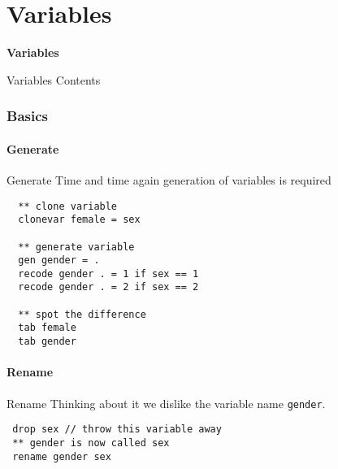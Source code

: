 \part{Variables}
\begin{frame}
\thispagestyle{empty}
\textbf{\huge{Variables}}
\end{frame}

\begin{frame}{Variables Contents}
 \tableofcontents
\end{frame}

\section{Basics}
\subsection{Generate}
\begin{frame}[fragile]{Generate}      
Time and time again generation of variables is required
\begin{lstlisting}
  ** clone variable
  clonevar female = sex

  ** generate variable
  gen gender = .
  recode gender . = 1 if sex == 1
  recode gender . = 2 if sex == 2

  ** spot the difference
  tab female
  tab gender
\end{lstlisting}
\end{frame}

\subsection{Rename}
\begin{frame}[fragile]{Rename}
Thinking about it we dislike the variable name \texttt{gender}.  
\begin{lstlisting}
 drop sex // throw this variable away
 ** gender is now called sex
 rename gender sex
\end{lstlisting}
\end{frame}

